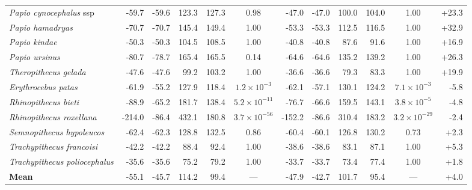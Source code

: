 \begin{table}[H]
{\begin{tabular}{l rr rr c rr rr c r}
        \textit{Papio cynocephalus} ssp & -59.7 & -59.6 & 123.3 & 127.3 & 0.98 & -47.0 & -47.0 & 100.0 & 104.0 & 1.00 & +23.3 \\
        \textit{Papio hamadryas} & -70.7 & -70.7 & 145.4 & 149.4 & 1.00 & -53.3 & -53.3 & 112.5 & 116.5 & 1.00 & +32.9 \\
        \textit{Papio kindae} & -50.3 & -50.3 & 104.5 & 108.5 & 1.00 & -40.8 & -40.8 & 87.6 & 91.6 & 1.00 & +16.9 \\
        \textit{Papio ursinus} & -80.7 & -78.7 & 165.4 & 165.5 & 0.14 & -64.6 & -64.6 & 135.2 & 139.2 & 1.00 & +26.3 \\
        \textit{Theropithecus gelada} & -47.6 & -47.6 & 99.2 & 103.2 & 1.00 & -36.6 & -36.6 & 79.3 & 83.3 & 1.00 & +19.9 \\
        \textit{Erythrocebus patas} & -61.9 & -55.2 & 127.9 & 118.4 & $1.2\!\times\!10^{-3}$ & -62.1 & -57.1 & 130.1 & 124.2 & $7.1\!\times\!10^{-3}$ & -5.8 \\
        \textit{Rhinopithecus bieti} & -88.9 & -65.2 & 181.7 & 138.4 & $5.2\!\times\!10^{-11}$ & -76.7 & -66.6 & 159.5 & 143.1 & $3.8\!\times\!10^{-5}$ & -4.8 \\
        \textit{Rhinopithecus roxellana} & -214.0 & -86.4 & 432.1 & 180.8 & $3.7\!\times\!10^{-56}$ & -152.2 & -86.6 & 310.4 & 183.2 & $3.2\!\times\!10^{-29}$ & -2.4 \\
        \textit{Semnopithecus hypoleucos} & -62.4 & -62.3 & 128.8 & 132.5 & 0.86 & -60.4 & -60.1 & 126.8 & 130.2 & 0.73 & +2.3 \\
        \textit{Trachypithecus francoisi} & -42.2 & -42.2 & 88.4 & 92.4 & 1.00 & -38.6 & -38.6 & 83.1 & 87.1 & 1.00 & +5.3 \\
        \textit{Trachypithecus poliocephalus} & -35.6 & -35.6 & 75.2 & 79.2 & 1.00 & -33.7 & -33.7 & 73.4 & 77.4 & 1.00 & +1.8 \\
        \midrule
        \textbf{Mean} & -55.1 & -45.7 & 114.2 & 99.4 & --- & -47.9 & -42.7 & 101.7 & 95.4 & --- & +4.0 \\
        \bottomrule
    \end{tabular}}

\end{table}
